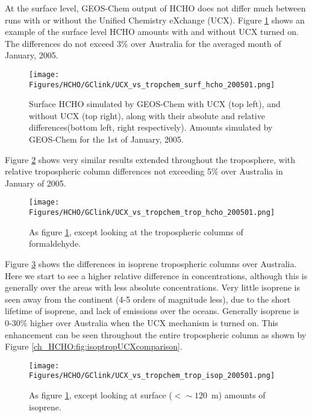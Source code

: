     At the surface level, GEOS-Chem output of HCHO does not differ much between runs with or without the Unified Chemistry eXchange (UCX).
    Figure \ref{ch_HCHO:fig:HCHOsurfUCXcomparison} shows an example of the surface level HCHO amounts with and without UCX turned on.
    The differences do not exceed 3\% over Australia for the averaged month of January, 2005.
    
    \begin{figure}%
      \texttt{[image: Figures/HCHO/GClink/UCX\_vs\_tropchem\_surf\_hcho\_200501.png]}
      \caption{ %
        Surface HCHO simulated by GEOS-Chem with UCX (top left), and without UCX (top right), along with their absolute and relative differences(bottom left, right respectively).
        Amounts simulated by GEOS-Chem for the 1st of January, 2005.
      }
      \label{ch_HCHO:fig:HCHOsurfUCXcomparison}
    \end{figure}
    
    Figure \ref{ch_HCHO:fig:HCHOtropcolUCXcomparison} shows very similar results extended throughout the troposphere, with relative tropospheric column differences not exceeding 5\% over Australia in January of 2005.
    
    \begin{figure}%
      \texttt{[image: Figures/HCHO/GClink/UCX\_vs\_tropchem\_trop\_hcho\_200501.png]}
      \caption{ %
        As figure \ref{ch_HCHO:fig:HCHOsurfUCXcomparison}, except looking at the tropospheric columns of formaldehyde. 
      }      
      \label{ch_HCHO:fig:HCHOtropcolUCXcomparison}
    \end{figure}
    
    Figure \ref{ch_HCHO:fig:isopsurfUCXcomparison} shows the differences in isoprene tropospheric columns over Australia.
    Here we start to see a higher relative difference in concentrations, although this is generally over the areas with less absolute concentrations. 
    Very little isoprene is seen away from the continent (4-5 orders of magnitude less), due to the short lifetime of isoprene, and lack of emissions over the oceans.
    Generally isoprene is 0-30\% higher over Australia when the UCX mechanism is turned on.
    This enhancement can be seen throughout the entire tropospheric column as shown by Figure \ref{ch_HCHO:fig:isoptropUCXcomparison}.
    
    \begin{figure}%
      \texttt{[image: Figures/HCHO/GClink/UCX\_vs\_tropchem\_trop\_isop\_200501.png]}
      \caption{%
        As figure \ref{ch_HCHO:fig:HCHOsurfUCXcomparison}, except looking at surface ($ < \sim 120$~m) amounts of isoprene.
      }
      \label{ch_HCHO:fig:isopsurfUCXcomparison}
    \end{figure}
    
